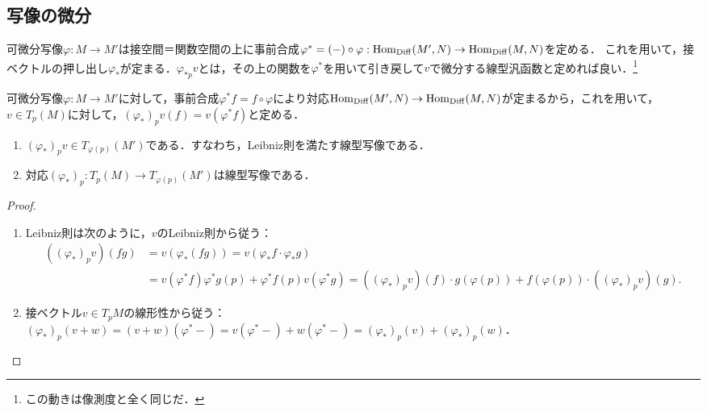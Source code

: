 \documentclass[uplatex,dvipdfmx]{jsreport}
\begin{document}
\subsection{写像の微分}

\begin{tcolorbox}[colframe=ForestGreen, colback=ForestGreen!10!white,breakable,colbacktitle=ForestGreen!40!white,coltitle=black,fonttitle=\bfseries\sffamily,
title=]
    可微分写像$\varphi:M\to M'$は接空間＝関数空間の上に事前合成$\varphi^*=(-)\circ\varphi:\mathrm{Hom}_{\mathrm{Diff}}(M',N)\to\mathrm{Hom}_{\mathrm{Diff}}(M,N)$を定める．
    これを用いて，接ベクトルの押し出し$\varphi_*$が定まる．$\varphi_{*p}v$とは，その上の関数を$\varphi^*$を用いて引き戻して$v$で微分する線型汎函数と定めれば良い．\footnote{この動きは像測度と全く同じだ．}
\end{tcolorbox}

\begin{lemma}
    可微分写像$\varphi:M\to M'$に対して，事前合成$\varphi^*f=f\circ\varphi$により対応$\mathrm{Hom}_{\mathrm{Diff}}(M',N)\to\mathrm{Hom}_{\mathrm{Diff}}(M,N)$が定まるから，これを用いて，
    $v\in T_p(M)$に対して，$(\varphi_*)_pv(f)=v(\varphi^*f)$と定める．
    \begin{enumerate}
        \item $(\varphi_*)_pv\in T_{\varphi(p)}(M')$である．すなわち，Leibniz則を満たす線型写像である．
        \item 対応$(\varphi_*)_p:T_p(M)\to T_{\varphi(p)}(M')$は線型写像である．
    \end{enumerate}
\end{lemma}
\begin{proof}\mbox{}
    \begin{enumerate}
        \item Leibniz則は次のように，$v$のLeibniz則から従う：
        \begin{align*}
            ((\varphi_*)_pv)(fg)&=v(\varphi_*(fg))=v(\varphi_*f\cdot\varphi_*g)\\
            &=v(\varphi^*f)\varphi^*g(p)+\varphi^*f(p)v(\varphi^*g)=((\varphi_*)_pv)(f)\cdot g(\varphi(p))+f(\varphi(p))\cdot ((\varphi_*)_pv)(g).
        \end{align*}
        \item 接ベクトル$v\in T_pM$の線形性から従う：
        $(\varphi_*)_p(v+w)=(v+w)(\varphi^*-)=v(\varphi^*-)+w(\varphi^*-)=(\varphi_*)_p(v)+(\varphi_*)_p(w)$．
    \end{enumerate}
\end{proof}
\end{document}
